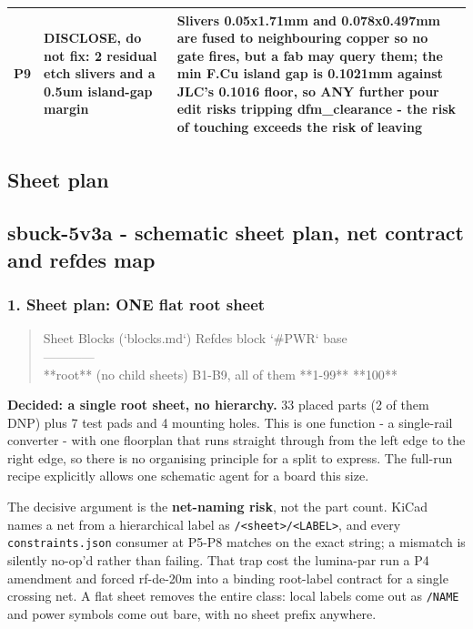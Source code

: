 \documentclass[11pt,a4paper]{article}
\begin{document}
{\begin{longtable}{lp{5.2cm}p{7.2cm}}
P9 & DISCLOSE, do not fix: 2 residual etch slivers and a 0.5um island-gap margin & Slivers 0.05x1.71mm and 0.078x0.497mm are fused to neighbouring copper so no gate fires, but a fab may query them; the min F.Cu island gap is 0.1021mm against JLC's 0.1016 floor, so ANY further pour edit risks tripping dfm\_clearance - the risk of touching exceeds the risk of leaving \\
\bottomrule
\end{longtable}
}
\subsection*{Sheet plan}
\subsection*{sbuck-5v3a - schematic sheet plan, net contract and refdes map}
\subsubsection*{1. Sheet plan: ONE flat root sheet}
\begin{quote}\small\ttfamily\raggedright
\textbar{} Sheet \textbar{} Blocks (`blocks.md`) \textbar{} Refdes block \textbar{} `\#PWR` base \textbar{}\\
\textbar{}---\textbar{}---\textbar{}---\textbar{}---\textbar{}\\
\textbar{} {*}{*}root{*}{*} (no child sheets) \textbar{} B1-B9, all of them \textbar{} {*}{*}1-99{*}{*} \textbar{} {*}{*}100{*}{*} \textbar{}
\end{quote}
\textbf{Decided: a single root sheet, no hierarchy.} 33 placed parts (2 of them DNP) plus 7 test pads and 4 mounting holes. This is one function - a single-rail converter - with one floorplan that runs straight through from the left edge to the right edge, so there is no organising principle for a split to express. The full-run recipe explicitly allows one schematic agent for a board this size.

The decisive argument is the \textbf{net-naming risk}, not the part count. KiCad names a net from a hierarchical label as \texttt{/\textless{}sheet\textgreater{}/\textless{}LABEL\textgreater{}}, and every \texttt{constraints.json} consumer at P5-P8 matches on the exact string; a mismatch is silently no-op'd rather than failing. That trap cost the lumina-par run a P4 amendment and forced rf-de-20m into a binding root-label contract for a single crossing net. A flat sheet removes the entire class: local labels come out as \texttt{/NAME} and power symbols come out bare, with no sheet prefix anywhere.
\end{document}
